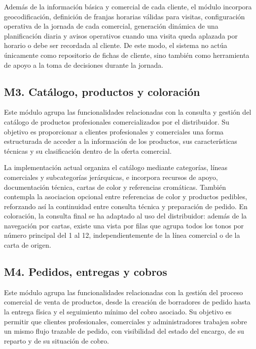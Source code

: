 Además de la información básica y comercial de cada cliente, el módulo incorpora geocodificación, definición de franjas horarias válidas para visitas, configuración operativa de la jornada de cada comercial, generación dinámica de una planificación diaria y avisos operativos cuando una visita queda aplazada por horario o debe ser recordada al cliente. De este modo, el sistema no actúa únicamente como repositorio de fichas de cliente, sino también como herramienta de apoyo a la toma de decisiones durante la jornada.

\subsection{M3. Catálogo, productos y coloración}

Este módulo agrupa las funcionalidades relacionadas con la consulta y gestión del catálogo de productos profesionales comercializados por el distribuidor. Su objetivo es proporcionar a clientes profesionales y comerciales una forma estructurada de acceder a la información de los productos, sus características técnicas y su clasificación dentro de la oferta comercial.

La implementación actual organiza el catálogo mediante categorías, líneas comerciales y subcategorías jerárquicas, e incorpora recursos de apoyo, documentación técnica, cartas de color y referencias cromáticas. También contempla la asociacion opcional entre referencias de color y productos pedibles, reforzando así la continuidad entre consulta técnica y preparación de pedido. En coloración, la consulta final se ha adaptado al uso del distribuidor: además de la navegación por cartas, existe una vista por filas que agrupa todos los tonos por número principal del 1 al 12, independientemente de la línea comercial o de la carta de origen.

\subsection{M4. Pedidos, entregas y cobros}

Este módulo agrupa las funcionalidades relacionadas con la gestión del proceso comercial de venta de productos, desde la creación de borradores de pedido hasta la entrega física y el seguimiento mínimo del cobro asociado. Su objetivo es permitir que clientes profesionales, comerciales y administradores trabajen sobre un mismo flujo trazable de pedido, con visibilidad del estado del encargo, de su reparto y de su situación de cobro.

